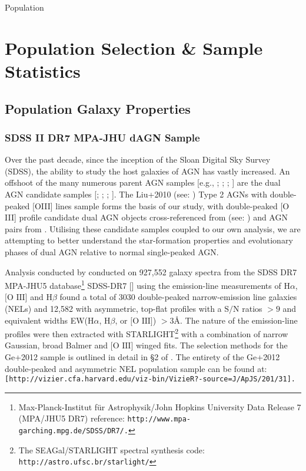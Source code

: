 Population

\section{Population Selection \& Sample Statistics}
\subsection{Population Galaxy Properties}
\subsubsection{SDSS II DR7 MPA-JHU dAGN Sample}

Over the past decade, since the inception of the Sloan Digital Sky Survey (SDSS), the ability to study the host galaxies of AGN has vastly increased. An offshoot of the many numerous parent AGN samples [e.g., \cite{Zakamska2003}; \cite{Kewley_2006}; \cite{Stasinska_2006}; \cite{Wild_2010}] are the dual AGN candidate samples [\cite{Smith_2010}; \cite{Liu_2012}; \cite{Ge_Hu_Wang_Bai_Zhang_2012}; \cite{2012ApJ...753...42C}]. The Liu+2010 (see: \cite{Liu_2009}) Type 2 AGNs with double-peaked [OIII] lines sample forms the basis of our study, with double-peaked [O III] profile candidate dual AGN objects cross-referenced from (see: \cite{Ge_Hu_Wang_Bai_Zhang_2012}) and AGN pairs from \cite{Liu_2012}. Utilising these candidate samples coupled to our own analysis, we are attempting to better understand the star-formation properties and evolutionary phases of dual AGN relative to normal single-peaked AGN. 

Analysis conducted by \cite{Ge_Hu_Wang_Bai_Zhang_2012} conducted on 927,552 galaxy spectra from the SDSS DR7 MPA-JHU5 database\footnote{\tiny{Max-Planck-Institut für Astrophysik/John Hopkins University Data Release 7 (MPA/JHU5 DR7) reference: \tt{http://www.mpa-garching.mpg.de/SDSS/DR7/}.}} SDSS-DR7 [\cite{2009ApJS..182..543A}] using the emission-line measurements of $\text{H}\alpha$, $\text{[O III]}$ and $\text{H}\beta$ found a total of 3030 double-peaked narrow-emission line galaxies (NELs) and 12,582 with asymmetric, top-ﬂat proﬁles with a $\text{S/N}$ ratios ${>}{9}$ and equivalent widths EW($\text{H}\alpha$, $\text{H}\beta$, or $\text{[O III]}$) ${>}{3}Å$. The nature of the emission-line profiles were then extracted with STARLIGHT\footnote{\tiny{The SEAGal/STARLIGHT spectral synthesis code: \tt{http://astro.ufsc.br/starlight/}}} with a combination of narrow Gaussian, broad Balmer and $\text{[O III]}$ winged fits. The selection methods for the Ge+2012 sample is outlined in detail in §2 of \cite{Ge_Hu_Wang_Bai_Zhang_2012}. The entirety of the Ge+2012 double-peaked and asymmetric NEL population sample can be found at: \tt{[http://vizier.cfa.harvard.edu/viz-bin/VizieR?-source=J/ApJS/201/31]}.

